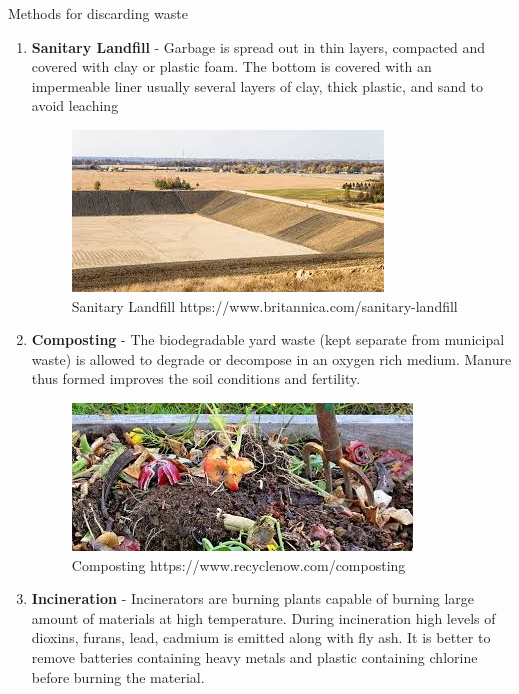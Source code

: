 \documentclass[final]{beamer}
\newlength{\onecolwid}
\newlength{\twocolwid}
\begin{document}
\begin{frame}
\begin{columns}[t]
\begin{column}{\twocolwid}
\begin{columns}[t,totalwidth=\twocolwid]
\begin{column}{\onecolwid}
\begin{exampleblock}{Methods for discarding waste}
\begin{enumerate}
\item \textbf{Sanitary Landfill} - Garbage is spread out in thin layers, compacted and covered with clay or plastic foam. The bottom is covered with an impermeable liner usually several layers of clay, thick plastic, and sand to avoid leaching
\begin{figure}
\includegraphics[width=1\linewidth]{img/landfill.jpg}
\caption{Sanitary Landfill \smallskip https://www.britannica.com/sanitary-landfill}
\end{figure}
\item \textbf{Composting} - The biodegradable yard waste (kept separate from municipal waste) is allowed to degrade or decompose in an oxygen rich medium. Manure thus formed improves the soil conditions and fertility.
\begin{figure}
\includegraphics[width=1\linewidth]{img/compost.jpg}
\caption{Composting \smallskip https://www.recyclenow.com/composting}
\end{figure}
\item \textbf{Incineration} - Incinerators are burning plants capable of burning large amount of materials at high temperature. During incineration high levels of dioxins, furans, lead, cadmium is emitted along with fly ash. It is better to remove batteries containing heavy metals and plastic containing chlorine before burning the material.
\end{enumerate}





\end{exampleblock}
\end{column}
\end{columns}
\end{column}
\end{columns}
\end{frame}
\end{document}
